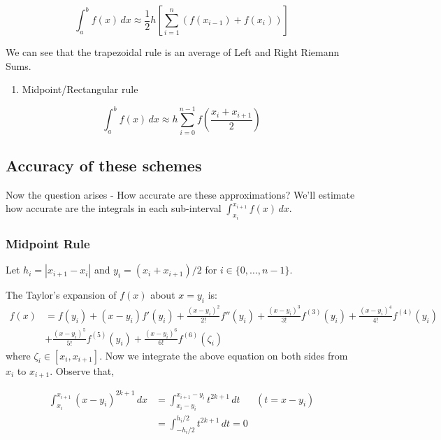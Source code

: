 \documentclass[
]{book}
\providecommand{\tightlist}{%
  \setlength{\itemsep}{0pt}\setlength{\parskip}{0pt}}
\begin{document}
\begin{equation}
\int_a^b f(x) \, dx \approx \frac{1}{2} h \left[ \sum_{i=1}^n (f(x_{i-1})+f(x_i)) \right]
\end{equation}

We can see that the trapezoidal rule is an average of Left and Right Riemann Sums.

\begin{enumerate}
\def\labelenumi{\arabic{enumi}.}
\setcounter{enumi}{3}
\tightlist
\item
  Midpoint/Rectangular rule
\end{enumerate}

\begin{equation}
\int_a^b f(x) \, dx \approx h \sum_{i=0}^{n-1} f\left( \frac{x_i+x_{i+1}}{2} \right) 
\end{equation}

\hypertarget{accuracy-of-these-schemes}{%
\subsection{Accuracy of these schemes}\label{accuracy-of-these-schemes}}

Now the question arises - How accurate are these approximations? We'll estimate how accurate are the integrals in each sub-interval \(\int_{x_i}^{x_{i+1}} f(x)\, dx\).

\hypertarget{midpoint-rule}{%
\subsubsection{Midpoint Rule}\label{midpoint-rule}}

Let \(h_i = |x_{i+1}-x_i|\) and \(y_i = (x_i+x_{i+1})/2\) for \(i\in \{0,\dots,n-1\}\).

The Taylor's expansion of \(f(x)\) about \(x = y_i\) is:
\begin{align*}
f(x) &= f(y_i) + (x-y_i) f'(y_i) + \frac{(x-y_i)^2}{2!} f''(y_i) + \frac{(x-y_i)^3}{3!} f^{(3)}(y_i)+ \frac{(x-y_i)^4}{4!} f^{(4)}(y_i)\\
&+ \frac{(x-y_i)^5}{5!} f^{(5)}(y_i)+ \frac{(x-y_i)^6}{6!} f^{(6)}(\zeta_i)
\end{align*}
where \(\zeta_i \in [x_i,x_{i+1}]\). Now we integrate the above equation on both sides from \(x_{i}\) to \(x_{i+1}\). Observe that,

\begin{align*}
\int_{x_i}^{x_{i+1}} (x-y_i)^{2k+1}\, dx &= \int_{x_i-y_i}^{x_{i+1}-y_i}t^{2k+1}\, dt & (t= x - y_i)\\
 &= \int_{-h_i/2}^{h_i/2}t^{2k+1}\, dt = 0  &
\end{align*}
\end{document}
